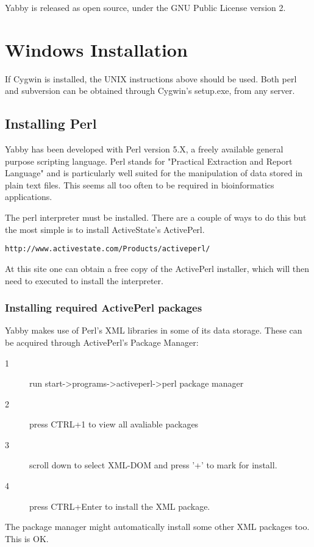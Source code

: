 Yabby is released as open source, under the GNU Public License
version 2.

\section{Windows Installation}

If Cygwin is installed, the UNIX instructions above should be used. Both
perl and subversion can be obtained through Cygwin's
setup.exe, from any server.

\subsection{Installing Perl}

Yabby has been developed with Perl version 5.X, a freely available general
purpose scripting language. Perl stands for "Practical Extraction and Report
Language" and is particularly well suited for the manipulation of data stored
in plain text files. This seems all too often to be required in bioinformatics
applications.

The perl interpreter must be installed. There are a couple of ways to do this
but the most simple is to install ActiveState's ActivePerl.
\begin{verbatim}
http://www.activestate.com/Products/activeperl/
\end{verbatim}
At this site one can obtain a free copy of the ActivePerl installer, which
will then need to executed to install the interpreter.

\subsubsection{Installing required ActivePerl packages}

Yabby makes use of Perl's XML libraries in some of its data storage. These can
be acquired through ActivePerl's Package Manager:
\begin{description}
  \item[1] run start->programs->activeperl->perl package manager
  \item[2] press CTRL+1 to view all avaliable packages
  \item[3] scroll down to select XML-DOM and press '+' to mark for install.
  \item[4] press CTRL+Enter to install the XML package.
\end{description}

The package manager might automatically install some other XML packages too. This is OK.


